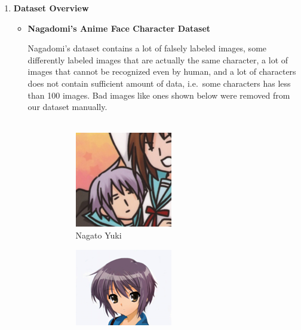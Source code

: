 \documentclass[11.5pt]{article}
\begin{document}
    \begin{enumerate}
        \item \textbf{Dataset Overview}
        \begin{itemize}
            \item \textbf{Nagadomi's Anime Face Character Dataset}

            Nagadomi's dataset contains a lot of falsely labeled images, some differently labeled images that are actually the same character, a lot of images that cannot be recognized even by human, and a lot of characters does not contain sufficient amount of data, i.e.\ some characters has less than 100 images.
            Bad images like ones shown below were removed from our dataset manually.\\ \\
            \begin{figure}[h!]
                \begin{subfigure}[h]{0.5\linewidth}
                    \centering
                    \includegraphics[width=0.5\linewidth, scale=0.5]{../data_set/moeimouto-faces/007_nagato_yuki/face_145_303_113.png}
                    \caption{Nagato Yuki}
                \end{subfigure}
                \begin{subfigure}[h]{0.5\linewidth}
                    \centering
                    \includegraphics[width=0.5\linewidth, scale=0.5]{../data_set/moeimouto-faces/007_nagato_yuki/face_235_235_128.png}

\end{subfigure}
\end{figure}
\end{itemize}
\end{enumerate}
\end{document}
